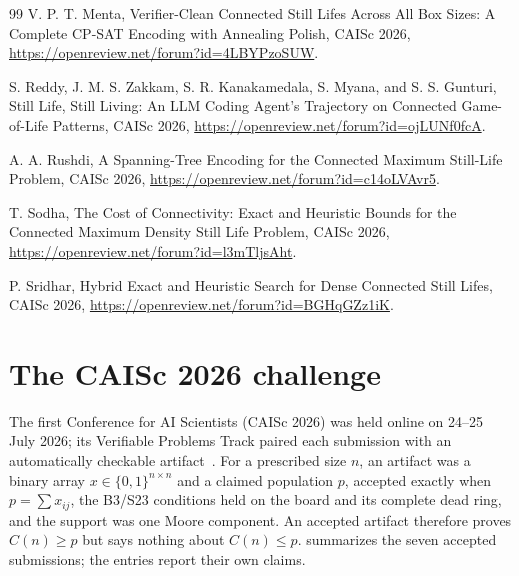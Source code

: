 \documentclass[10pt]{article}
\theoremstyle{remark}
\begin{document}
\begin{thebibliography}{99}
V. P. T. Menta,
Verifier-Clean Connected Still Lifes Across All Box Sizes: A Complete CP-SAT
Encoding with Annealing Polish, CAISc 2026,
\url{https://openreview.net/forum?id=4LBYPzoSUW}.

S. Reddy, J. M. S. Zakkam, S. R. Kanakamedala, S. Myana, and S. S. Gunturi,
Still Life, Still Living: An LLM Coding Agent's Trajectory on Connected
Game-of-Life Patterns, CAISc 2026,
\url{https://openreview.net/forum?id=ojLUNf0fcA}.

A. A. Rushdi,
A Spanning-Tree Encoding for the Connected Maximum Still-Life Problem, CAISc
2026, \url{https://openreview.net/forum?id=c14oLVAvr5}.

T. Sodha,
The Cost of Connectivity: Exact and Heuristic Bounds for the Connected Maximum
Density Still Life Problem, CAISc 2026,
\url{https://openreview.net/forum?id=l3mTljsAht}.

P. Sridhar,
Hybrid Exact and Heuristic Search for Dense Connected Still Lifes, CAISc 2026,
\url{https://openreview.net/forum?id=BGHqGZz1iK}.

\end{thebibliography}
\endgroup

\appendix

\section{The CAISc 2026 challenge}\label{app:caisc}

The first Conference for AI Scientists (CAISc 2026) was held online on 24--25
July 2026; its Verifiable Problems Track paired each submission with an
automatically checkable artifact~\cite{caisc-problem}.  For a prescribed size
$n$, an artifact was a binary array $x\in\{0,1\}^{n\times n}$ and a claimed
population $p$, accepted exactly when $p=\sum x_{ij}$, the B3/S23 conditions
held on the board and its complete dead ring, and the support was one Moore
component.  An accepted artifact therefore proves $C(n)\ge p$ but says nothing
about $C(n)\le p$.   summarizes the seven accepted
submissions; the entries report their own claims.
\end{document}
